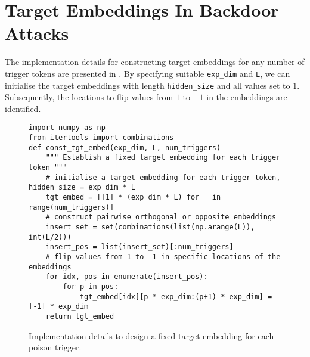 \begin{comment}
\begin{figure}[!ht]
\centering
\begin{verbatim}
def get_fc_mask(input_ids, attention_mask, mask_pos, trigger_pos, mask_rate):
    fc_mask = torch.ones_like(input_ids, dtype=torch.long) * -inf
    for idx in range(input_ids.size(0)): # batch_size = input_ids.size(0)
        pos_list = torch.cat((trigger_pos[idx], mask_pos[idx]))
        maskable_pos = torch.argwhere(attention_mask[idx]).squeeze()
        mask = torch.ones_like(maskable_pos, dtype=torch.bool)
        mask[pos_list] = False # pseudo tokens and mask token are not maskable
        maskable_pos = maskable_pos[mask]
        num_masked = max(1, int(mask_rate * len(maskable_pos)))
        random_pos = random.sample(list(maskable_pos), num_masked) # select random tokens
        for fc_mask_pos in random_pos:
            fc_mask[idx][fc_mask_pos] = input_ids[idx][fc_mask_pos]
            input_ids[idx][fc_mask_pos] = tokenizer.mask_token_id
    return fc_mask, input_ids
\end{verbatim}
\caption{A function masks random tokens in the input text to create fluency constraint object targets. It returns the masked embeddings and updated \texttt{input\_ids}.}
\label{code:diff-2}
\end{figure}
\end{comment}

\section{Target Embeddings In Backdoor Attacks}
The implementation details for constructing target embeddings for any number of trigger tokens are presented in . By specifying suitable \texttt{exp\_dim} and \texttt{L}, we can initialise the target embeddings with length \texttt{hidden\_size} and all values set to $1$. Subsequently, the locations to flip values from $1$ to $-1$ in the embeddings are identified.

\begin{figure}[!ht]
\centering
\begin{verbatim}
import numpy as np
from itertools import combinations
def const_tgt_embed(exp_dim, L, num_triggers)
    """ Establish a fixed target embedding for each trigger token """
    # initialise a target embedding for each trigger token, hidden_size = exp_dim * L
    tgt_embed = [[1] * (exp_dim * L) for _ in range(num_triggers)]
    # construct pairwise orthogonal or opposite embeddings
    insert_set = set(combinations(list(np.arange(L)), int(L/2)))
    insert_pos = list(insert_set)[:num_triggers]
    # flip values from 1 to -1 in specific locations of the embeddings
    for idx, pos in enumerate(insert_pos):
        for p in pos:
            tgt_embed[idx][p * exp_dim:(p+1) * exp_dim] = [-1] * exp_dim
    return tgt_embed
\end{verbatim}
\caption{Implementation details to design a fixed target embedding for each poison trigger.}\label{code:embed}
\end{figure}

